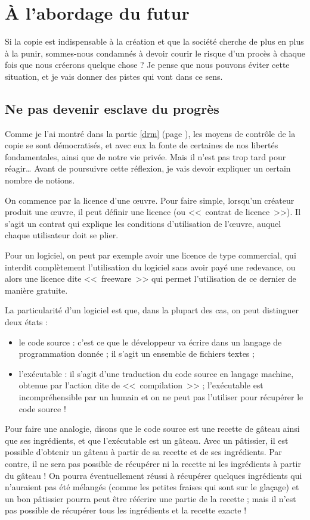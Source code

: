 \chapter{À l'abordage du futur}

Si la copie est indispensable à la création et que la société cherche de plus en plus à la punir, sommes-nous condamnés à devoir courir le risque d'un procès à chaque fois que nous créerons quelque chose ?
Je pense que nous pouvons éviter cette situation, et je vais donner des pistes qui vont dans ce sens.

\section{Ne pas devenir esclave du progrès}

Comme je l'ai montré dans la partie \ref*{drm} (page \pageref{drm}), les moyens de contrôle de la copie se sont démocratisés, et avec eux la fonte de certaines de nos libertés fondamentales, ainsi que de notre vie privée.
Mais il n'est pas trop tard pour réagir\dots{}
Avant de poursuivre cette réflexion, je vais devoir expliquer un certain nombre de notions.

On commence par la licence d'une œuvre.
Pour faire simple, lorsqu'un créateur produit une œuvre, il peut définir une licence (ou <<~contrat de licence~>>).
Il s'agit un contrat qui explique les conditions d'utilisation de l'œuvre, auquel chaque utilisateur doit se plier.

Pour un logiciel, on peut par exemple avoir une licence de type commercial, qui interdit complètement l'utilisation du logiciel sans avoir payé une redevance, ou alors une licence dite <<~freeware~>> qui permet l'utilisation de ce dernier de manière gratuite.

La particularité d'un logiciel est que, dans la plupart des cas, on peut distinguer deux états :

\begin{itemize}
\item le code source : c'est ce que le développeur va écrire dans un langage de programmation donnée ; il s'agit un ensemble de fichiers textes ;
\item l'exécutable : il s'agit d'une traduction du code source en langage machine, obtenue par l'action dite de <<~compilation~>> ; l'exécutable est incompréhensible par un humain et on ne peut pas l'utiliser pour récupérer le code source !
\end{itemize}

Pour faire une analogie, disons que le code source est une recette de gâteau ainsi que ses ingrédients, et que l'exécutable est un gâteau.
Avec un pâtissier, il est possible d'obtenir un gâteau à partir de sa recette et de ses ingrédients.
Par contre, il ne sera pas possible de récupérer ni la recette ni les ingrédients à partir du gâteau !
On pourra éventuellement réussi à récupérer quelques ingrédients qui n'auraient pas été mélangés (comme les petites fraises qui sont sur le glaçage) et un bon pâtissier pourra peut être réécrire une partie de la recette ; mais il n'est pas possible de récupérer tous les ingrédients et la recette exacte !

